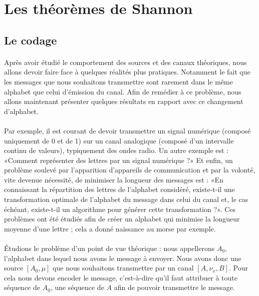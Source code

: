 \section{Les théorèmes de Shannon}

\subsection{Le codage}
	\paragraph{}
	Après avoir étudié le comportement des sources et des canaux théoriques, nous
	allons devoir faire face à quelques réalités plus pratiques. Notamment le fait
	que les messages que nous souhaitons transmettre sont rarement dans le 
	même alphabet que celui d'émission du canal. Afin de remédier à ce problème,
	nous allons maintenant présenter quelques résultats en rapport avec ce 
	changement d'alphabet. 
	
	\paragraph{}
	Par exemple, il est courant de devoir transmettre un signal numérique
	(composé uniquement de 0 et de 1) sur un canal analogique (composé 
	d'un intervalle continu de valeurs), typiquement des ondes radio.
	Un autre exemple est : «Comment représenter des 
	lettres par un signal numérique ?» Et enfin, un problème soulevé par 
	l'apparition d'appareils de communication et par la volonté, vite devenue nécessité, 
	de minimiser la longueur des messages est :
	«En connaissant la répartition des lettres de l'alphabet considéré,
	existe-t-il une transformation optimale de l'alphabet du message
	dans celui du canal et, le cas échéant, existe-t-il un algorithme pour générer cette transformation ?».
	Ces problèmes ont été étudiés afin de créer un alphabet qui minimise la longueur moyenne
	d'une lettre ; cela a donné naissance au morse par exemple. 
	
	\paragraph{}
	Étudions le problème d'un point de vue théorique :
	nous appellerons $A_0$, l'alphabet dans lequel nous avons le message à envoyer. Nous avons donc une source 
	$[A_0,\mu]$ que nous souhaitons transmettre par un canal $[A,\nu_x,B]$. Pour cela nous devons encoder
	le message, c'est-à-dire qu'il faut attribuer à toute séquence de $A_0$, une séquence de $A$ afin de 
	pouvoir transmettre le message.

